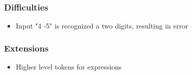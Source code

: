 \documentclass{beamer}
\begin{document}
\begin{frame}
\frametitle{Difficulties}
\begin{itemize}
\item Input "4 -5" is recognized a two digits, resulting in error
\end{itemize}
\end{frame}

\begin{frame}
\frametitle{Extensions}
\begin{itemize}
\item Higher level tokens for expressions
\end{itemize}
\end{frame}

\begin{frame}
\end{frame}
\end{document}
